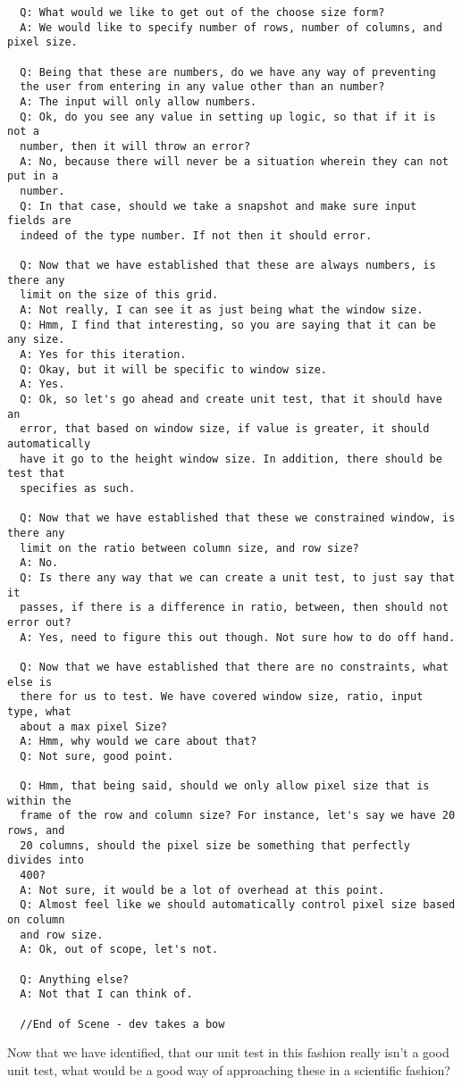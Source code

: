 \begin{verbatim}
  Q: What would we like to get out of the choose size form?
  A: We would like to specify number of rows, number of columns, and pixel size.

  Q: Being that these are numbers, do we have any way of preventing
  the user from entering in any value other than an number?
  A: The input will only allow numbers.
  Q: Ok, do you see any value in setting up logic, so that if it is not a
  number, then it will throw an error?
  A: No, because there will never be a situation wherein they can not put in a
  number.
  Q: In that case, should we take a snapshot and make sure input fields are
  indeed of the type number. If not then it should error.

  Q: Now that we have established that these are always numbers, is there any
  limit on the size of this grid.
  A: Not really, I can see it as just being what the window size.
  Q: Hmm, I find that interesting, so you are saying that it can be any size.
  A: Yes for this iteration.
  Q: Okay, but it will be specific to window size.
  A: Yes.
  Q: Ok, so let's go ahead and create unit test, that it should have an
  error, that based on window size, if value is greater, it should automatically
  have it go to the height window size. In addition, there should be test that
  specifies as such.

  Q: Now that we have established that these we constrained window, is there any
  limit on the ratio between column size, and row size?
  A: No.
  Q: Is there any way that we can create a unit test, to just say that it
  passes, if there is a difference in ratio, between, then should not error out?
  A: Yes, need to figure this out though. Not sure how to do off hand.

  Q: Now that we have established that there are no constraints, what else is
  there for us to test. We have covered window size, ratio, input type, what
  about a max pixel Size?
  A: Hmm, why would we care about that?
  Q: Not sure, good point.

  Q: Hmm, that being said, should we only allow pixel size that is within the
  frame of the row and column size? For instance, let's say we have 20 rows, and
  20 columns, should the pixel size be something that perfectly divides into
  400?
  A: Not sure, it would be a lot of overhead at this point.
  Q: Almost feel like we should automatically control pixel size based on column
  and row size.
  A: Ok, out of scope, let's not.

  Q: Anything else?
  A: Not that I can think of.

  //End of Scene - dev takes a bow
\end{verbatim}


Now that we have identified, that our unit test in this fashion really isn't a
good unit test, what would be a good way of approaching these in a scientific
fashion?
